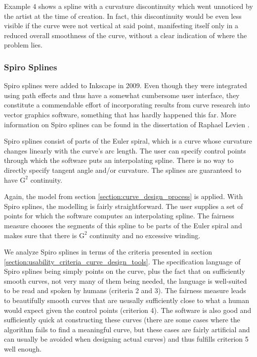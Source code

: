\documentclass[a4paper]{article}
\begin{document}
				Example 4 shows a spline with a curvature discontinuity which went unnoticed by the artist at the time of creation. In fact, this discontinuity would be even less visible if the curve were not vertical at said point, manifesting itself only in a reduced overall smoothness of the curve, without a clear indication of where the problem lies.

			\subsubsection{Spiro Splines}
			\label{section:spiro_splines}

				Spiro splines were added to Inkscape in 2009. Even though they were integrated using path effects and thus have a somewhat cumbersome user interface, they constitute a commendable effort of incorporating results from curve research into vector graphics software, something that has hardly happened this far. More information on Spiro splines can be found in the dissertation of Raphael Levien \cite{Levien2009}.

				Spiro splines consist of parts of the Euler spiral, which is a curve whose curvature changes linearly with the curve's arc length. The user can specify control points through which the software puts an interpolating spline. There is no way to directly specify tangent angle and/or curvature. The splines are guaranteed to have \(\mathrm{G}^2\) continuity.

				Again, the model from section \ref{section:curve_design_process} is applied. With Spiro splines, the modelling is fairly straightforward. The user supplies a set of points for which the software computes an interpolating spline. The fairness measure chooses the segments of this spline to be parts of the Euler spiral and makes sure that there is \(\mathrm{G}^2\) continuity and no excessive winding.

				We analyze Spiro splines in terms of the criteria presented in section \ref{section:usability_criteria_curve_design_tools}. The specification language of Spiro splines being simply points on the curve, plus the fact that on sufficiently smooth curves, not very many of them being needed, the language is well-suited to be read and spoken by humans (criteria 2 and 3). The fairness measure leads to beautifully smooth curves that are ususally sufficiently close to what a human would expect given the control points (criterion 4). The software is also good and sufficiently quick at constructing these curves (there are some cases where the algorithm fails to find a meaningful curve, but these cases are fairly artificial and can usually be avoided when designing actual curves) and thus fulfills criterion 5 well enough.
\end{document}
